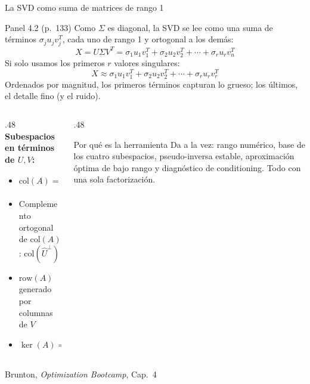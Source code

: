 \documentclass[10pt,aspectratio=169]{beamer}
\newcommand{\fuente}{\vfill{\scriptsize\color{gray}Brunton, \emph{Optimization Bootcamp}, Cap.~4}}
\newcommand{\col}{\mathrm{col}}
\begin{document}
\begin{frame}{La SVD como suma de matrices de rango 1}
  \small
  \begin{block}{Panel 4.2 (p.~133)}
    Como $\Sigma$ es diagonal, la SVD se lee como una suma de términos
    $\sigma_j u_j v_j^T$, cada uno de rango 1 y ortogonal a los demás:
    \[
      X = U\Sigma V^T = \sigma_1 u_1 v_1^T + \sigma_2 u_2 v_2^T
             + \cdots + \sigma_r u_r v_n^T
    \]
    Si solo usamos los primeros $r$ valores singulares:
    \[
      X \approx \sigma_1 u_1 v_1^T + \sigma_2 u_2 v_2^T
             + \cdots + \sigma_r u_r v_r^T
    \]
    Ordenados por magnitud, los primeros términos capturan lo grueso;
    los últimos, el detalle fino (y el ruido).
  \end{block}

  \vspace{1mm}
  \begin{columns}[T,onlytextwidth]
    \begin{column}{.48\textwidth}
      \textbf{Subespacios en términos de $U,V$:}
      \begin{itemize}
        \item $\col(A) = \col(\hat{U})$
        \item Complemento ortogonal de $\col(A)$: $\col(\hat{U}^\perp)$
        \item $\mathrm{row}(A)$ generado por columnas de $V$
        \item $\ker(A) = \col(V^\perp)$
      \end{itemize}
    \end{column}
    \begin{column}{.48\textwidth}
      \begin{block}{Por qué es la herramienta}
        \scriptsize
        Da a la vez: rango numérico, base de los cuatro subespacios,
        pseudo-inversa estable, aproximación óptima de bajo rango y
        diagnóstico de conditioning. Todo con una sola factorización.
      \end{block}
    \end{column}
  \end{columns}
  \fuente
\end{frame}
\end{document}
